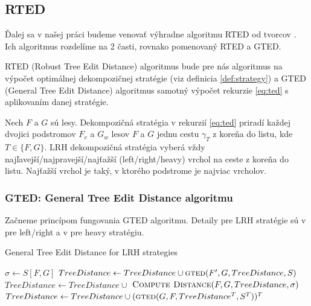 \subsection{RTED}

Ďalej sa v našej práci budeme venovať výhradne algoritmu RTED od tvorcov \citet{RTED}.
Ich algoritmus rozdelíme na 2 časti, rovnako pomenovaný RTED a GTED.

RTED (Robust Tree Edit Distance) algoritmus bude pre nás algoritmus na výpočet
optimálnej dekompozičnej stratégie (viz definicia \ref{def:strategy})
a GTED (General Tree Edit Distance) algoritmus samotný výpočet rekurzie \ref{eq:ted}
s aplikovaním danej stratégie.

\begin{definice}\label{def:strategy}
	Nech $F$ a $G$ sú lesy. Dekompozičná stratégia v rekurzií \ref{eq:ted} priradí
  každej dvojici podstromov $F_{v}$ a $G_{w}$ lesov $F$ a $G$ jednu cestu $\gamma_{T}$
  z koreňa do listu, kde $T \in \{F, G\}$.
	LRH dekompozičná stratégia vyberá vždy najľavejší/najpravejší/najťažší
	(left/right/heavy) vrchol na ceste z koreňa do listu. Najťažší vrchol je taký,
	v ktorého podstrome je najviac vrcholov. 
\end{definice}

\subsubsection{GTED: General Tree Edit Distance algoritmu}

Začneme princípom fungovania GTED algoritmu. Detaily pre LRH stratégie sú
v \citet{ZHANGSHASHA} pre left/right a v \citet{DMRW} pre heavy stratégiu.

\begin{algorithm}
  \caption{General Tree Edit Distance for LRH strategies}
  \label{alg:gted}
  \begin{algorithmic}[1]
      \State $\sigma \gets S[F, G]$
          \State $TreeDistance \gets TreeDistance \cup \Call{gted}{F', G, TreeDistance, S}$
        \EndFor
        \State $TreeDistance \gets TreeDistance \cup$
        \Indent
          \State $\Call{Compute Distance}{F, G, TreeDistance, \sigma}$
        \EndIndent
      \Else
        \State $TreeDistance \gets TreeDistance \cup (\Call{gted}{G, F, TreeDistance^{T}, S^{T}})^{T}$
      \EndIf
      \State {}
    \EndProcedure
  \end{algorithmic}
\end{algorithm}

